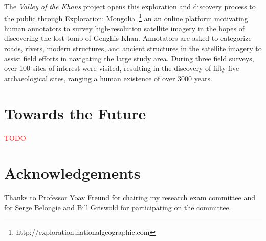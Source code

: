 \documentclass[10pt,twocolumn]{article}
\begin{document}
The \textit{Valley of the Khans} project opens this exploration and discovery
process to the public through Exploration: 
Mongolia~\footnote{http://exploration.nationalgeographic.com} an
an online platform motivating human annotators to survey high-resolution
satellite imagery in the hopes of discovering the lost tomb of Genghis Khan.
Annotators are asked to categorize roads, rivers, modern structures, and
ancient structures in the satellite imagery to assist field efforts in
navigating the large study area. During three field surveys, over 100
sites of interest were visited, resulting in the discovery of fifty-five
archaeological sites, ranging a human existence of over 3000 years.

\section{Towards the Future}
\textcolor{red}{TODO}

\section{Acknowledgements}
Thanks to Professor Yoav Freund for chairing my research exam committee and 
for Serge Belongie and Bill Griswold for participating on the committee.



\end{document}
